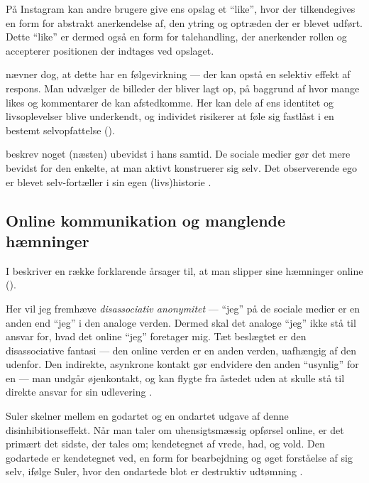 På Instagram kan andre brugere give ens opslag et “like”, hvor der 
tilkendegives en form for abstrakt anerkendelse af, den ytring og 
optræden der er blevet udført. Dette “like” er dermed også en form 
for talehandling, der anerkender rollen og accepterer positionen 
der indtages ved opslaget.

\citeauthor{sulerSelfPortraitsSelfies2015} nævner dog, at dette 
har en følgevirkning — der kan opstå en selektiv effekt af 
respons. Man udvælger de billeder der bliver lagt op, på baggrund 
af hvor mange likes og kommentarer de kan afstedkomme.  Her kan 
dele af ens identitet og livsoplevelser blive underkendt, og 
individet risikerer at føle sig fastlåst i en bestemt 
selvopfattelse (\citeyear{sulerSelfPortraitsSelfies2015}).

\citeauthor{goffmanPresentationSelfEveryday1956} beskrev noget 
(næsten) ubevidst i hans samtid. De sociale medier gør det mere 
bevidst for den enkelte, at man aktivt konstruerer sig selv.
Det observerende ego er blevet selv-fortæller i sin egen 
(livs)historie \autocite{sulerSelfPortraitsSelfies2015}.

\subsection{Online kommunikation og manglende hæmninger}

I  beskriver 
\citeauthor{sulerOnlineDisinhibitionEffect2004}  en række 
forklarende årsager til, at man slipper sine
hæmninger online (\citeyear{sulerOnlineDisinhibitionEffect2004}).

Her vil jeg fremhæve \emph{disassociativ anonymitet} — “jeg” på de
sociale medier er en anden end “jeg” i den analoge verden.  Dermed
skal det analoge “jeg” ikke stå til ansvar for, hvad det online 
“jeg” foretager mig. Tæt beslægtet er den disassociative fantasi — 
den online verden er en anden verden, uafhængig af den udenfor.
Den indirekte, asynkrone kontakt gør endvidere den anden “usynlig”
for en — man undgår øjenkontakt, og kan flygte fra åstedet uden at
skulle stå til direkte ansvar for sin udlevering \autocite[s.  
184]{sulerOnlineDisinhibitionEffect2004}.

Suler skelner mellem en godartet og en ondartet udgave af denne
disinhibitionseffekt. Når man taler om uhensigtsmæssig opførsel
online, er det primært det sidste, der tales om; kendetegnet af
vrede, had, og vold. Den godartede er kendetegnet ved, en form for
bearbejdning og øget forståelse af sig selv, ifølge Suler, hvor
den ondartede blot er destruktiv udtømning \autocite[s.  
185]{sulerOnlineDisinhibitionEffect2004}.

